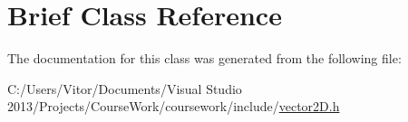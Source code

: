 \hypertarget{class_brief}{}\section{Brief Class Reference}
\label{class_brief}


The documentation for this class was generated from the following file\+:\begin{DoxyCompactItemize}
\item 
C\+:/\+Users/\+Vitor/\+Documents/\+Visual Studio 2013/\+Projects/\+Course\+Work/coursework/include/\hyperlink{vector2_d_8h}{vector2\+D.\+h}\end{DoxyCompactItemize}
